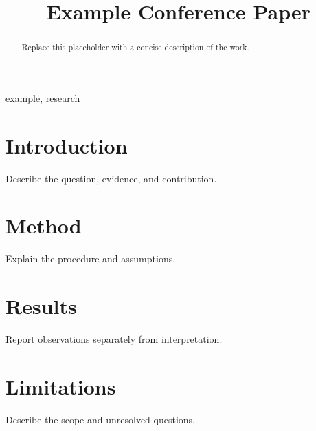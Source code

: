 \documentclass[conference]{IEEEtran}
\title{Example Conference Paper}
\author{\IEEEauthorblockN{Author Name}
\IEEEauthorblockA{Organization\\City, Country}}
\begin{document}
\maketitle
\begin{abstract}
Replace this placeholder with a concise description of the work.
\end{abstract}
\begin{IEEEkeywords}
example, research
\end{IEEEkeywords}
\section{Introduction}
Describe the question, evidence, and contribution.
\section{Method}
Explain the procedure and assumptions.
\section{Results}
Report observations separately from interpretation.
\section{Limitations}
Describe the scope and unresolved questions.
\end{document}
